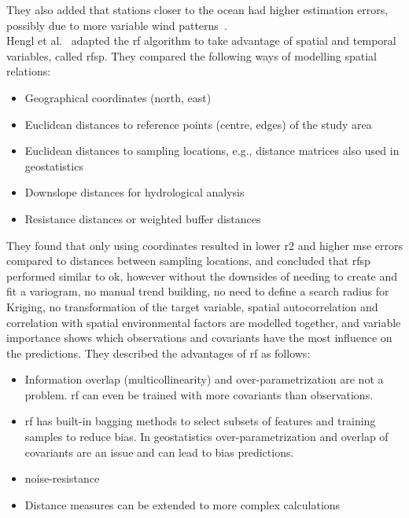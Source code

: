 They also added that stations closer to the ocean had higher estimation errors, possibly due to more variable wind patterns~\cite{runnalls2000dynamics}.\\
Hengl et al.~\cite{hengl2018random} adapted the \gls{rf} algorithm to take advantage of spatial and temporal variables, called \gls{rfsp}. They compared the following ways of modelling spatial relations:

\begin{itemize}
    \item Geographical coordinates (north, east)
    \item Euclidean distances to reference points (centre, edges) of the study area 
    \item Euclidean distances to sampling locations, e.g., distance matrices also used in geostatistics
    \item Downslope distances for hydrological analysis
    \item Resistance distances or weighted buffer distances
\end{itemize}

They found that only using coordinates resulted in lower \gls{r2} and higher \gls{mse} errors compared to distances between sampling locations, and concluded that \gls{rfsp} performed similar to \gls{ok}, however without the downsides of needing to create and fit a variogram, no manual trend building, no need to define a search radius for Kriging, no transformation of the target variable, spatial autocorrelation and correlation with spatial environmental factors are modelled together, and variable importance shows which observations and covariants have the most influence on the predictions. They described the advantages of \gls{rf} as follows:

\begin{itemize}
    \item Information overlap (multicollinearity) and over-parametrization are not a problem. \gls{rf} can even be trained with more covariants than observations.
    \item \gls{rf} has built-in bagging methods to select subsets of features and training samples to reduce bias. In geostatistics over-parametrization and overlap of covariants are an issue and can lead to bias predictions.
    \item noise-resistance~\cite{strobl2007bias}
    \item Distance measures can be extended to more complex calculations
\end{itemize}

